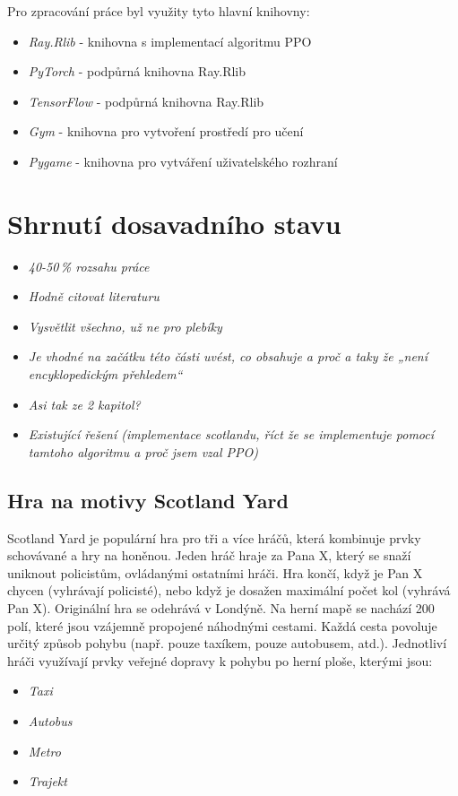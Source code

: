 Pro zpracování práce byl využity tyto hlavní knihovny:
\begin{itemize}
  \item \emph{Ray.Rlib} - knihovna s implementací algoritmu PPO
  \item \emph{PyTorch} - podpůrná knihovna Ray.Rlib
  \item \emph{TensorFlow} - podpůrná knihovna Ray.Rlib
  \item \emph{Gym} - knihovna pro vytvoření prostředí pro učení
  \item \emph{Pygame} - knihovna pro vytváření uživatelského rozhraní
\end{itemize}


\chapter{Shrnutí dosavadního stavu}
\label{dosavadni-stav}

\begin{itemize}
  \item \emph {40-50\,\% rozsahu práce}
  \item \emph{Hodně citovat literaturu}
  \item \emph{Vysvětlit všechno, už ne pro plebíky}
  \item \emph{Je vhodné na začátku této části uvést, co obsahuje a proč a taky že „není encyklopedickým přehledem“}
  \item \emph{Asi tak ze 2 kapitol?}
  \item \emph{Existující řešení (implementace scotlandu, říct že se implementuje pomocí tamtoho algoritmu a proč jsem vzal PPO)}
\end{itemize}


\section{Hra na motivy Scotland Yard}

Scotland Yard je populární hra pro tři a více hráčů, která kombinuje prvky schovávané a hry na honěnou.
Jeden hráč hraje za Pana X, který se snaží uniknout policistům, ovládanými ostatními hráči.
Hra končí, když je Pan X chycen (vyhrávají policisté), nebo když je dosažen maximální počet kol (vyhrává Pan X).
Originální hra se odehrává v Londýně.
Na herní mapě se nachází 200 polí, které jsou vzájemně propojené náhodnými cestami.
Každá cesta povoluje určitý způsob pohybu (např.
pouze taxíkem, pouze autobusem, atd.).
Jednotliví hráči využívají prvky veřejné dopravy k pohybu po herní ploše, kterými jsou:
\begin{itemize}
  \item \emph{Taxi}
  \item \emph{Autobus}
  \item \emph{Metro}
  \item \emph{Trajekt}
\end{itemize}

